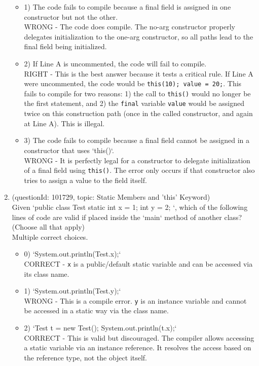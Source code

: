 \documentclass[12pt]{article}
\begin{document}
\begin{enumerate}[label=(\arabic*)]
\begin{itemize}
\item 1) The code fails to compile because a final field is assigned in one constructor but not the other.
 \\ 
WRONG - The code does compile. The no-arg constructor properly delegates initialization to the one-arg constructor, so all paths lead to the final field being initialized.

\item 2) If Line A is uncommented, the code will fail to compile.
 \\ 
RIGHT - This is the best answer because it tests a critical rule. If Line A were uncommented, the code would be \verb|this(10); value = 20;|. This fails to compile for two reasons: 1) the call to \verb|this()| would no longer be the first statement, and 2) the \verb|final| variable \verb|value| would be assigned twice on this construction path (once in the called constructor, and again at Line A). This is illegal.

\item 3) The code fails to compile because a final field cannot be assigned in a constructor that uses `this()`.
 \\ 
WRONG - It is perfectly legal for a constructor to delegate initialization of a final field using \verb|this()|. The error only occurs if that constructor also tries to assign a value to the field itself.

\end{itemize}
\item (questionId: 101729, topic: Static Members and 'this' Keyword) \\ 
Given `public class Test { static int x = 1; int y = 2; }`, which of the following lines of code are valid if placed inside the `main` method of another class? (Choose all that apply)
\\ \noindent Multiple correct choices. 
\begin{itemize}
\item 0) `System.out.println(Test.x);`
 \\ 
CORRECT - \verb|x| is a public/default static variable and can be accessed via its class name.

\item 1) `System.out.println(Test.y);`
 \\ 
WRONG - This is a compile error. \verb|y| is an instance variable and cannot be accessed in a static way via the class name.

\item 2) `Test t = new Test(); System.out.println(t.x);`
 \\ 
CORRECT - This is valid but discouraged. The compiler allows accessing a static variable via an instance reference. It resolves the access based on the reference type, not the object itself.


\end{itemize}
\end{enumerate}
\end{document}
